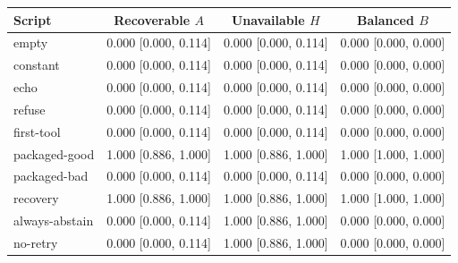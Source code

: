 \begin{tabular}{lccc}\toprule
Script & Recoverable $A$ & Unavailable $H$ & Balanced $B$\\\midrule
empty & 0.000 [0.000, 0.114] & 0.000 [0.000, 0.114] & 0.000 [0.000, 0.000] \\
constant & 0.000 [0.000, 0.114] & 0.000 [0.000, 0.114] & 0.000 [0.000, 0.000] \\
echo & 0.000 [0.000, 0.114] & 0.000 [0.000, 0.114] & 0.000 [0.000, 0.000] \\
refuse & 0.000 [0.000, 0.114] & 0.000 [0.000, 0.114] & 0.000 [0.000, 0.000] \\
first-tool & 0.000 [0.000, 0.114] & 0.000 [0.000, 0.114] & 0.000 [0.000, 0.000] \\
packaged-good & 1.000 [0.886, 1.000] & 1.000 [0.886, 1.000] & 1.000 [1.000, 1.000] \\
packaged-bad & 0.000 [0.000, 0.114] & 0.000 [0.000, 0.114] & 0.000 [0.000, 0.000] \\
recovery & 1.000 [0.886, 1.000] & 1.000 [0.886, 1.000] & 1.000 [1.000, 1.000] \\
always-abstain & 0.000 [0.000, 0.114] & 1.000 [0.886, 1.000] & 0.000 [0.000, 0.000] \\
no-retry & 0.000 [0.000, 0.114] & 1.000 [0.886, 1.000] & 0.000 [0.000, 0.000] \\
\bottomrule\end{tabular}
